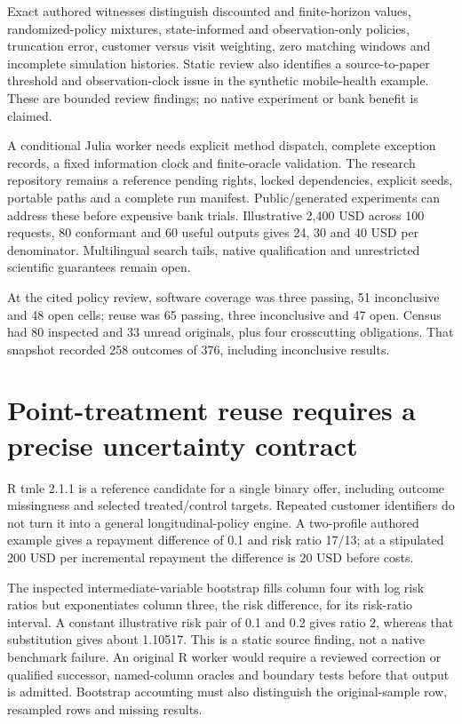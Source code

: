 Exact authored witnesses distinguish discounted and finite-horizon
values, randomized-policy mixtures, state-informed and observation-only
policies, truncation error, customer versus visit weighting, zero
matching windows and incomplete simulation histories. Static review also
identifies a source-to-paper threshold and observation-clock issue in
the synthetic mobile-health example. These are bounded review findings;
no native experiment or bank benefit is claimed.
\citep{exec24_policyother_contract}

A conditional Julia worker needs explicit method dispatch, complete
exception records, a fixed information clock and finite-oracle
validation. The research repository remains a reference pending rights,
locked dependencies, explicit seeds, portable paths and a complete run
manifest. Public/generated experiments can address these before
expensive bank trials. Illustrative 2,400 USD across 100 requests, 80
conformant and 60 useful outputs gives 24, 30 and 40 USD per
denominator. Multilingual search tails, native qualification and
unrestricted scientific guarantees remain open.
\citep{exec24_policyother_tools,exec24_policyother_ope,exec24_policyother_contract}

At the cited policy review, software coverage was three passing, 51
inconclusive and 48 open cells; reuse was 65 passing, three inconclusive
and 47 open. Census had 80 inspected and 33 unread originals, plus four
crosscutting obligations. That snapshot recorded 258 outcomes of 376,
including inconclusive results.
\citep{sp24policyother_reader,sp24policyother_progress}

\hypertarget{point-treatment-reuse-requires-a-precise-uncertainty-contract}{%
\section{Point-treatment reuse requires a precise uncertainty
contract}\label{point-treatment-reuse-requires-a-precise-uncertainty-contract}}

R tmle 2.1.1 is a reference candidate for a single binary offer,
including outcome missingness and selected treated/control targets.
Repeated customer identifiers do not turn it into a general
longitudinal-policy engine. A two-profile authored example gives a
repayment difference of 0.1 and risk ratio 17/13; at a stipulated 200
USD per incremental repayment the difference is 20 USD before costs.
\citep{exec20_rfx_tmle,exec24_tmle_sources,exec24_tmle_contract}

The inspected intermediate-variable bootstrap fills column four with log
risk ratios but exponentiates column three, the risk difference, for its
risk-ratio interval. A constant illustrative risk pair of 0.1 and 0.2
gives ratio 2, whereas that substitution gives about 1.10517. This is a
static source finding, not a native benchmark failure. An original R
worker would require a reviewed correction or qualified successor,
named-column oracles and boundary tests before that output is admitted.
Bootstrap accounting must also distinguish the original-sample row,
resampled rows and missing results.
\citep{exec24_tmle_sources,exec24_tmle_contract}

